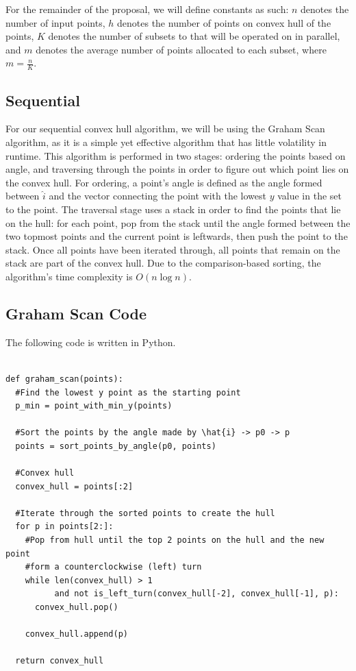 \documentclass[12pt]{article}
\begin{document}
For the remainder of the proposal, we will define constants as such: $n$ denotes the number of input points, $h$ denotes the number of points on convex hull of the points, $K$ denotes the number of subsets to that will be operated on in parallel, and $m$ denotes the average number of points allocated to each subset, where $m = \frac{n}{K}$.

\subsection{Sequential}


For our sequential convex hull algorithm, we will be using the Graham Scan algorithm, as it is a simple yet effective algorithm that has little volatility in runtime. This algorithm is performed in two stages: ordering the points based on angle, and traversing through the points in order to figure out which point lies on the convex hull. For ordering, a point’s angle is defined as the angle formed between $\hat{i}$ and the vector connecting the point with the lowest $y$ value in the set to the point. The traversal stage uses a stack in order to find the points that lie on the hull: for each point, pop from the stack until the angle formed between the two topmost points and the current point is leftwards, then push the point to the stack. Once all points have been iterated through, all points that remain on the stack are part of the convex hull. Due to the comparison-based sorting, the algorithm’s time complexity is $O(n\log n)$.

\subsection*{Graham Scan Code}

The following code is written in Python.

\begin{verbatim}
  
def graham_scan(points):
  #Find the lowest y point as the starting point
  p_min = point_with_min_y(points)

  #Sort the points by the angle made by \hat{i} -> p0 -> p
  points = sort_points_by_angle(p0, points)

  #Convex hull
  convex_hull = points[:2]

  #Iterate through the sorted points to create the hull
  for p in points[2:]:
    #Pop from hull until the top 2 points on the hull and the new point 
    #form a counterclockwise (left) turn
    while len(convex_hull) > 1 
          and not is_left_turn(convex_hull[-2], convex_hull[-1], p):
      convex_hull.pop()
    
    convex_hull.append(p)
  
  return convex_hull

\end{verbatim}
\end{document}
